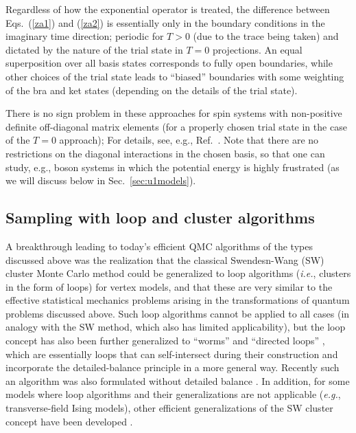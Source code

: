 \documentclass[range]{ar2e}
\begin{document}
Regardless of how the exponential operator is treated, the difference between Eqs.~(\ref{za1}) and (\ref{za2}) is essentially only in the boundary 
conditions in the imaginary time direction; periodic for $T>0$ (due to the trace being taken) and dictated by the nature of the trial state in $T=0$ 
projections. An equal superposition over all basis states corresponds to fully open boundaries, while other choices of the trial state leads to ``biased''
boundaries with some weighting of the bra and ket states (depending on the details of the trial state). 

There is no sign problem in these approaches for spin systems with non-positive definite off-diagonal matrix elements (for a properly chosen trial state in the 
case of the $T=0$ approach); For details, see, e.g., Ref.~\cite{Henelius00}. Note that there are no restrictions on the diagonal interactions in the chosen basis, 
so that one can study, e.g., boson systems in which the potential energy is highly frustrated (as we will discuss below in Sec.~\ref{sec:u1models}).


\subsection{Sampling with loop and cluster algorithms}

A breakthrough leading to today's efficient QMC algorithms of the types discussed above
was the realization \cite{Evertz93} that the classical Swendesn-Wang (SW) cluster 
Monte Carlo method \cite{Swendsen88} could be generalized to loop algorithms ({\em i.e.}, clusters in the form of loops) for vertex models, and that 
these are very similar to the effective statistical mechanics problems arising in the transformations of quantum problems discussed above. Such 
loop algorithms cannot be applied to all cases (in analogy with the SW method, which also has limited applicability), but the loop concept has also been further 
generalized to ``worms'' \cite{Prokofev96,Prokofev98, WormA} and ``directed loops'' \cite{Sandvik99,Syljuasen02}, which are essentially loops that can self-intersect
during their construction and incorporate the detailed-balance principle in a more general way. Recently such an algorithm was also formulated without
detailed balance \cite{Suwa10}. In addition, for some models where loop algorithms and their generalizations are not applicable ({\em e.g.}, transverse-field 
Ising models), other efficient generalizations of the SW cluster concept have been developed \cite{Rieger99,Sandvik03}.
\end{document}
